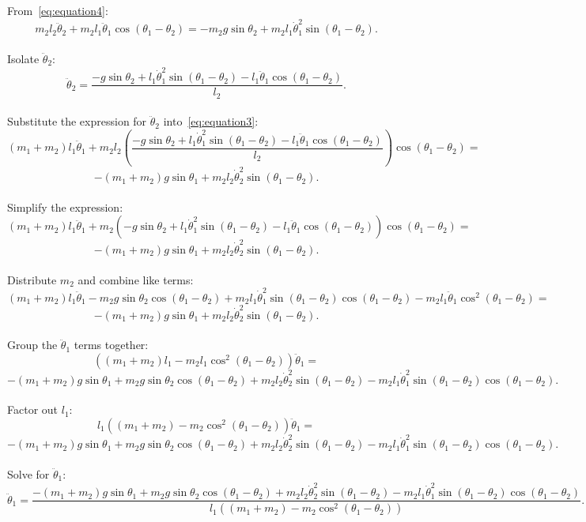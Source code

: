 \documentclass{article}
\begin{document}
From\ \eqref{eq:equation4}:
\[
m_2 l_2 \ddot{\theta}_2 + m_2 l_1 \ddot{\theta}_1 \cos(\theta_1 - \theta_2) = - m_2 g \sin \theta_2 + m_2 l_1 \dot{\theta}_1^2 \sin(\theta_1 - \theta_2).
\]
\\
Isolate \(\ddot{\theta}_2\):
\[
\ddot{\theta}_2 = \frac{- g \sin \theta_2 + l_1 \dot{\theta}_1^2 \sin(\theta_1 - \theta_2) - l_1 \ddot{\theta}_1 \cos(\theta_1 - \theta_2)}{l_2}.
\]
\\
Substitute the expression for \(\ddot{\theta}_2\) into\ \eqref{eq:equation3}:
\[(m_1 + m_2) l_1 \ddot{\theta}_1 + m_2 l_2 \left( \frac{- g \sin \theta_2 + l_1 \dot{\theta}_1^2 \sin(\theta_1 - \theta_2) - l_1 \ddot{\theta}_1 \cos(\theta_1 - \theta_2)}{l_2} \right) \cos(\theta_1 - \theta_2) =\] 
\[- (m_1 + m_2) g \sin \theta_1 + m_2 l_2 \dot{\theta}_2^2 \sin(\theta_1 - \theta_2).\]
\\
Simplify the expression:
\[
(m_1 + m_2) l_1 \ddot{\theta}_1 + m_2 \left( - g \sin \theta_2 + l_1 \dot{\theta}_1^2 \sin(\theta_1 - \theta_2) - l_1 \ddot{\theta}_1 \cos(\theta_1 - \theta_2) \right) \cos(\theta_1 - \theta_2) =
\]
\[
- (m_1 + m_2) g \sin \theta_1 + m_2 l_2 \dot{\theta}_2^2 \sin(\theta_1 - \theta_2).
\]
\\
Distribute \(m_2\) and combine like terms:
\[
(m_1 + m_2) l_1 \ddot{\theta}_1 - m_2 g \sin \theta_2 \cos(\theta_1 - \theta_2) + m_2 l_1 \dot{\theta}_1^2 \sin(\theta_1 - \theta_2) \cos(\theta_1 - \theta_2) - m_2 l_1 \ddot{\theta}_1 \cos^2(\theta_1 - \theta_2) =
\]
\[
- (m_1 + m_2) g \sin \theta_1 + m_2 l_2 \dot{\theta}_2^2 \sin(\theta_1 - \theta_2).
\]
\\
Group the \(\ddot{\theta}_1\) terms together:
\[
((m_1 + m_2) l_1 - m_2 l_1 \cos^2(\theta_1 - \theta_2)) \ddot{\theta}_1 = 
\]
\[
- (m_1 + m_2) g \sin \theta_1 + m_2 g \sin \theta_2 \cos(\theta_1 - \theta_2) + m_2 l_2 \dot{\theta}_2^2 \sin(\theta_1 - \theta_2) - m_2 l_1 \dot{\theta}_1^2 \sin(\theta_1 - \theta_2) \cos(\theta_1 - \theta_2).
\]
\\
Factor out \(l_1\):
\[
l_1 ((m_1 + m_2) - m_2 \cos^2(\theta_1 - \theta_2)) \ddot{\theta}_1 = 
\]
\[
- (m_1 + m_2) g \sin \theta_1 + m_2 g \sin \theta_2 \cos(\theta_1 - \theta_2) + m_2 l_2 \dot{\theta}_2^2 \sin(\theta_1 - \theta_2) - m_2 l_1 \dot{\theta}_1^2 \sin(\theta_1 - \theta_2) \cos(\theta_1 - \theta_2).
\]
\\
Solve for \(\ddot{\theta}_1\):
\[
\ddot{\theta}_1 = \frac{- (m_1 + m_2) g \sin \theta_1 + m_2 g \sin \theta_2 \cos(\theta_1 - \theta_2) + m_2 l_2 \dot{\theta}_2^2 \sin(\theta_1 - \theta_2) - m_2 l_1 \dot{\theta}_1^2 \sin(\theta_1 - \theta_2) \cos(\theta_1 - \theta_2)}{l_1 ((m_1 + m_2) - m_2 \cos^2(\theta_1 - \theta_2))}.
\]\\
\end{document}
